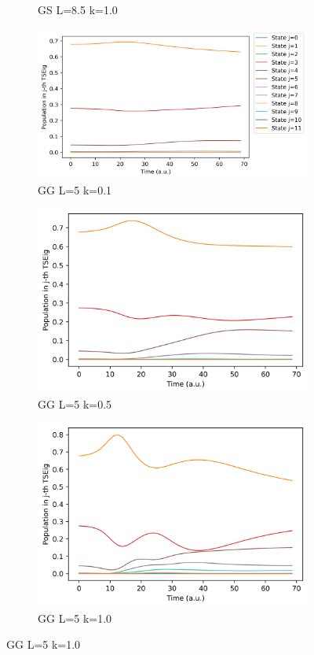 \documentclass[11pt, a4paper]{article} %
\begin{document}
\begin{figure}[h!]
\begin{subfigure}[b]{0.30\linewidth}
    \caption{GS L=8.5 k=1.0}
  \end{subfigure}
  \begin{subfigure}[b]{0.36\linewidth}
    \includegraphics[width=\linewidth]{Population_GG_L5_k0_0.1.png}
    \caption{GG L=5 k=0.1}
  \end{subfigure}
    \begin{subfigure}[b]{0.30\linewidth}
    \includegraphics[width=\linewidth]{Population_GG_L5_k0_0.5.png}
    \caption{GG L=5 k=0.5}
  \end{subfigure}  
  \begin{subfigure}[b]{0.30\linewidth}
    \includegraphics[width=\linewidth]{Population_GG_L5_k0_1.0.png}
    \caption{GG L=5 k=1.0}
  \end{subfigure}
  

\end{figure}
\end{document}

